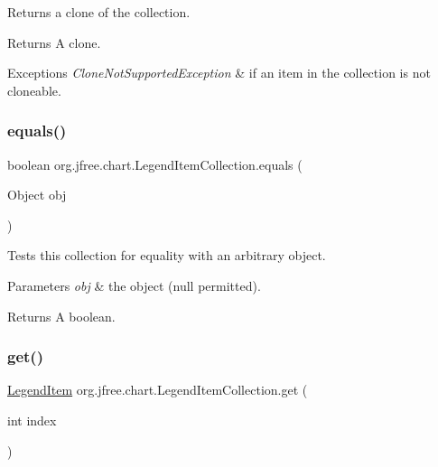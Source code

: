 Returns a clone of the collection.

\begin{DoxyReturn}{Returns}
A clone.
\end{DoxyReturn}

\begin{DoxyExceptions}{Exceptions}
{\em Clone\+Not\+Supported\+Exception} & if an item in the collection is not cloneable. \\
\hline
\end{DoxyExceptions}
\mbox{\label{classorg_1_1jfree_1_1chart_1_1_legend_item_collection_aa45403fda9dff0fe7b9f1cfc462f5959}} 
\subsubsection{\texorpdfstring{equals()}{equals()}}
{\footnotesize\ttfamily boolean org.\+jfree.\+chart.\+Legend\+Item\+Collection.\+equals (\begin{DoxyParamCaption}\item[{Object}]{obj }\end{DoxyParamCaption})}

Tests this collection for equality with an arbitrary object.


\begin{DoxyParams}{Parameters}
{\em obj} & the object ({\ttfamily null} permitted).\\
\hline
\end{DoxyParams}
\begin{DoxyReturn}{Returns}
A boolean. 
\end{DoxyReturn}
\mbox{\label{classorg_1_1jfree_1_1chart_1_1_legend_item_collection_a79733bd1dd221da70a0d9090a1d9ce36}} 
\subsubsection{\texorpdfstring{get()}{get()}}
{\footnotesize\ttfamily \mbox{\hyperlink{classorg_1_1jfree_1_1chart_1_1_legend_item}{Legend\+Item}} org.\+jfree.\+chart.\+Legend\+Item\+Collection.\+get (\begin{DoxyParamCaption}\item[{int}]{index }\end{DoxyParamCaption})}

